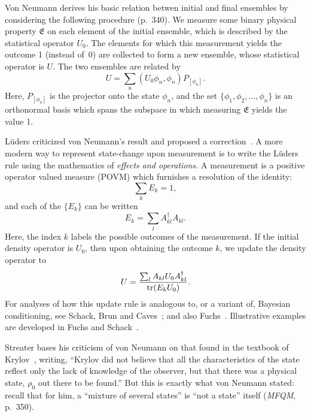 \documentclass[aps,pra,superscriptaddress,12pt,tightenlines,nofootinbib]{revtex4}
\newcommand{\tr}{\hbox{tr}}
\newcommand{\MFQM}{\textsl{MFQM}}
\begin{document}
Von Neumann derives his basic relation betwen initial and final
ensembles by considering the following procedure (p.\ 340).  We
measure some binary physical property $\mathfrak{E}$ on each element of the
initial ensemble, which is described by the statistical operator $U_0$.
The elements for which this measurement yields the outcome 1 (instead
of~0) are collected to form a new ensemble, whose statistical operator
is $U$.  The two ensembles are related by
\begin{equation}
U = \sum_n (U_0 \phi_n, \phi_n) P_{[\phi_n]}.
\end{equation}
Here, $P_{[\phi_n]}$ is the projector onto the state $\phi_n$, and the
set $\{\phi_1,\phi_2,\ldots,\phi_n\}$ is an orthonormal basis which
spans the subspace in which measuring $\mathfrak{E}$ yields the value 1.

L\"uders criticized von Neumann's result and proposed a
correction~\cite{Lueders1951}.  A more modern way to represent
state-change upon measurement is to write the L\"uders rule using the
mathematics of \emph{effects and operations.}  A measurement is a
positive operator valued measure (POVM) which furnishes a resolution
of the identity:
\begin{equation}
\sum_k E_k = 1,
\end{equation}
and each of the $\{E_k\}$ can be written
\begin{equation}
E_k = \sum_l A^\dag_{kl} A_{kl}.
\end{equation}
Here, the index $k$ labels the possible outcomes of the measurement.
If the initial density operator is $U_0$, then upon obtaining the
outcome $k$, we update the density operator to
\begin{equation}
U = \frac{\sum_l A_{kl} U_0 A^\dag_{kl}}
         {\tr(E_k U_0)}.
\end{equation}
For analyses of how this update rule is analogous to, or a variant of,
Bayesian conditioning, see Schack, Brun and Caves~\cite{Schack2001};
and also Fuchs~\cite{Fuchs2002}.  Illustrative examples are developed
in Fuchs and Schack~\cite{Fuchs2009}.

Streater bases his criticism of von Neumann on that found in the
textbook of Krylov~\cite{Krylov1979}, writing, ``Krylov did not
believe that all the characteristics of the state reflect only the
lack of knowledge of the observer, but that there was a physical
state, $\rho_0$ out there to be found.''  But this is exactly what von
Neumann stated: recall that for him, a ``mixture of several states''
is ``not a state'' itself (\MFQM, p.\ 350).
\end{document}
